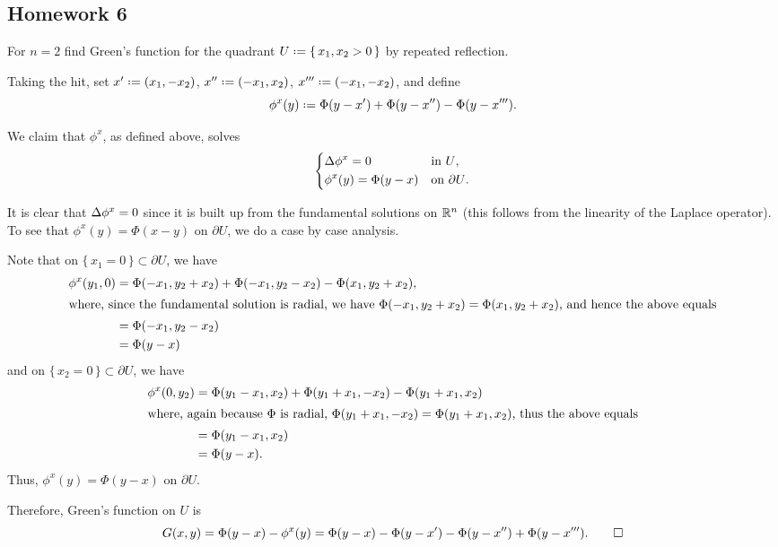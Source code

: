 \subsection{Homework 6}
\begin{problem}
  For \(n=2\) find Green's function for the quadrant
  \(U\defeq\{\,x_1,x_2>0\,\}\) by repeated reflection.
\end{problem}
\begin{solution*}
  Taking the hit, set \(x'\defeq(x_1,-x_2)\), \(x''\defeq(-x_1,x_2)\),
  \(x'''\defeq(-x_1,-x_2)\), and define
  \begin{equation}
    \label{eq:6:corrector}
    \phi^x(y)\defeq\Phi(y-x')+\Phi(y-x'')-\Phi(y-x''').
  \end{equation}

  We claim that \(\phi^x\), as defined above, solves
  \[
    \left\{
      \begin{aligned}
        &\Lap\phi^x=0&&\text{in \(U\),}\\
        &\phi^x(y)=\Phi(y-x)&&\text{on \(\partial U\).}
      \end{aligned}
    \right.
  \]

  It is clear that \(\Lap\phi^x=0\) since it is built up from the
  fundamental solutions on \(\mathbb{R}^n\) (this follows from the linearity of
  the Laplace operator). To see that \(\phi^x(y)=\Phi(x-y)\) on
  \(\partial U\), we do a case by case analysis.

  Note that on \(\{\,x_1=0\,\}\subset\partial U\), we have
  \begin{align*}
    \phi^x(y_1,0)
    &=\Phi(-x_1,y_2+x_2)+\Phi(-x_1,y_2-x_2)-\Phi(x_1,y_2+x_2),\\
    \intertext{where, since the fundamental solution is radial, we have
    \(\Phi(-x_1,y_2+x_2)=\Phi(x_1,y_2+x_2)\), and hence the above equals}
    &=\Phi(-x_1,y_2-x_2)\\
    &=\Phi(y-x)
  \end{align*}
  and on \(\{\,x_2=0\,\}\subset\partial U\), we have
  \begin{align*}
    \phi^x(0,y_2)
    &=\Phi(y_1-x_1,x_2)+\Phi(y_1+x_1,-x_2)-\Phi(y_1+x_1,x_2)\\
    \intertext{where, again because \(\Phi\) is radial,
    \(\Phi(y_1+x_1,-x_2)=\Phi(y_1+x_1,x_2)\), thus the above equals}
    &=\Phi(y_1-x_1,x_2)\\
    &=\Phi(y-x).
  \end{align*}
  Thus, \(\phi^x(y)=\Phi(y-x)\) on \(\partial U\).

  Therefore, Green's function on \(U\) is
  \[
    G(x,y)
    =\Phi(y-x)-\phi^x(y)%
    =\Phi(y-x)-\Phi(y-x')-\Phi(y-x'')+\Phi(y-x''').%
    \qedhere
  \]
\end{solution*}

